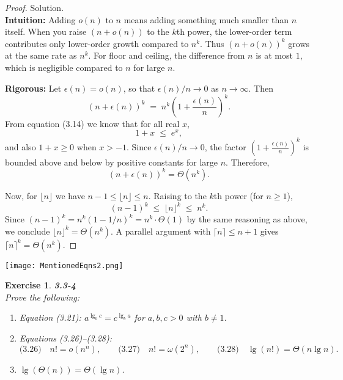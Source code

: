 \documentclass[12pt]{article}
\newtheorem{exercise}[theorem]{Exercise}
\theoremstyle{definition}
\begin{document}
\begin{proof}
Solution. \\

\noindent
\textbf{Intuition:}  
Adding $o(n)$ to $n$ means adding something much smaller than $n$ itself.  
When you raise $(n+o(n))$ to the $k$th power, the lower-order term contributes only lower-order growth compared to $n^k$.  
Thus $(n+o(n))^k$ grows at the same rate as $n^k$.  
For floor and ceiling, the difference from $n$ is at most $1$, which is negligible compared to $n$ for large $n$.

\noindent
\textbf{Rigorous:}  
Let $\epsilon(n) = o(n)$, so that $\epsilon(n)/n \to 0$ as $n\to\infty$. Then
\[
(n+\epsilon(n))^k \;=\; n^k \left(1 + \frac{\epsilon(n)}{n}\right)^k.
\]
From equation (3.14) we know that for all real $x$,
\[
1+x \;\le\; e^x,
\]
and also $1+x \ge 0$ when $x > -1$. Since $\epsilon(n)/n \to 0$, the factor $\left(1+\frac{\epsilon(n)}{n}\right)^k$ is bounded above and below by positive constants for large $n$. Therefore,
\[
(n+\epsilon(n))^k = \Theta(n^k).
\]

Now, for $\lfloor n \rfloor$ we have $n-1 \le \lfloor n \rfloor \le n$. Raising to the $k$th power (for $n\ge 1$),
\[
(n-1)^k \;\le\; \lfloor n \rfloor^k \;\le\; n^k.
\]
Since $(n-1)^k = n^k (1-1/n)^k = n^k \cdot \Theta(1)$ by the same reasoning as above, we conclude $\lfloor n \rfloor^k = \Theta(n^k)$.  
A parallel argument with $\lceil n \rceil \le n+1$ gives $\lceil n \rceil^k = \Theta(n^k)$.

\end{proof}

\newpage

\begin{center}
    \texttt{[image: MentionedEqns2.png]}
\end{center}

\newpage

\begin{exercise}
\noindent
\textbf{3.3-4} \\
Prove the following:
\begin{enumerate}
\item[(a)] Equation (3.21): \(a^{\lg_b c}=c^{\lg_b a}\) for \(a,b,c>0\) with \(b\ne 1\).
\item[(b)] Equations (3.26)–(3.28):
\[
\text{(3.26)}\quad n! = o(n^n), \qquad
\text{(3.27)}\quad n! = \omega(2^n), \qquad
\text{(3.28)}\quad \lg(n!) = \Theta(n\lg n).
\]
\item[(c)] \(\lg(\Theta(n))=\Theta(\lg n)\).
\end{enumerate}
\end{exercise}
\end{document}
